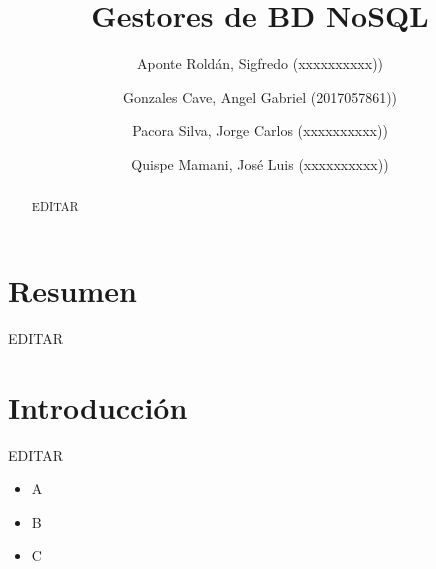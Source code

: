\documentclass[preprint,12pt]{elsarticle}
\begin{document}
	
	\begin{frontmatter}

		\title{\huge Gestores de BD NoSQL}
		
		\author{Aponte Roldán, Sigfredo              		(xxxxxxxxxx))}
		\author{Gonzales Cave, Angel Gabriel              	(2017057861))} %
		\author{Pacora Silva, Jorge Carlos         		(xxxxxxxxxx))} %
		\author{Quispe Mamani, José Luis             		(xxxxxxxxxx))} %
		\address{Tacna, Perú}
		

		\begin{abstract}
		
EDITAR

		\end{abstract}


	\end{frontmatter}


	\section{Resumen}

EDITAR




\section{Introducción} 

EDITAR

\begin{itemize}
\item A
\item B
\item C


\end{itemize}
\end{document}
